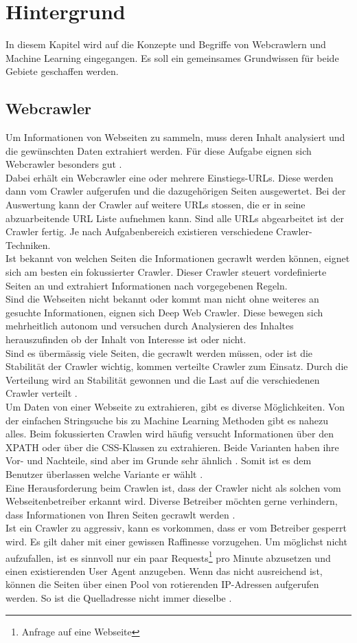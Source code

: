 \section{Hintergrund}
In diesem Kapitel wird auf die Konzepte und Begriffe von Webcrawlern und Machine Learning eingegangen. Es soll ein gemeinsames Grundwissen für beide Gebiete geschaffen werden.
%
\subsection{Webcrawler}
Um Informationen von Webseiten zu sammeln, muss deren Inhalt analysiert und die gewünschten Daten extrahiert werden. Für diese Aufgabe eignen sich Webcrawler besonders gut \cite{scrapy_1, scrapy_2}.\\
Dabei erhält ein Webcrawler eine oder mehrere Einstiegs-URLs. Diese werden dann vom Crawler aufgerufen und die dazugehörigen Seiten ausgewertet. Bei der Auswertung kann der Crawler auf weitere URLs stossen, die er in seine abzuarbeitende URL Liste aufnehmen kann. Sind alle URLs abgearbeitet ist der Crawler fertig. Je nach Aufgabenbereich existieren verschiedene Crawler-Techniken.\\
Ist bekannt von welchen Seiten die Informationen gecrawlt werden können, eignet sich am besten ein fokussierter Crawler. Dieser Crawler steuert vordefinierte Seiten an und extrahiert Informationen nach vorgegebenen Regeln.\\
Sind die Webseiten nicht bekannt oder kommt man nicht ohne weiteres an gesuchte Informationen, eignen sich Deep Web Crawler. Diese bewegen sich mehrheitlich autonom und versuchen durch Analysieren des Inhaltes herauszufinden ob der Inhalt von Interesse ist oder nicht.\\
Sind es übermässig viele Seiten, die gecrawlt werden müssen, oder ist die Stabilität der Crawler wichtig, kommen verteilte Crawler zum Einsatz. Durch die Verteilung wird an Stabilität gewonnen und die Last auf die verschiedenen Crawler verteilt \cite{scrapy_3}.\\[2ex]
%
Um Daten von einer Webseite zu extrahieren, gibt es diverse Möglichkeiten. Von der einfachen Stringsuche bis zu Machine Learning Methoden gibt es nahezu alles. Beim fokussierten Crawlen wird häufig versucht Informationen über den XPATH oder über die CSS-Klassen zu extrahieren. Beide Varianten haben ihre Vor- und Nachteile, sind aber im Grunde sehr ähnlich \cite{xpath_vs_css}. Somit ist es dem Benutzer überlassen welche Variante er wählt \cite{xpath}.\\[2ex]
%
Eine Herausforderung beim Crawlen ist, dass der Crawler nicht als solchen vom Webseitenbetreiber erkannt wird. Diverse Betreiber möchten gerne verhindern, dass Informationen von Ihren Seiten gecrawlt werden \cite{comparis}.\\
Ist ein Crawler zu aggressiv, kann es vorkommen, dass er vom Betreiber gesperrt wird. Es gilt daher mit einer gewissen Raffinesse vorzugehen. Um möglichst nicht aufzufallen, ist es sinnvoll nur ein paar Requests\footnote{Anfrage auf eine Webseite} pro Minute abzusetzen und einen existierenden User Agent anzugeben. Wenn das nicht ausreichend ist, können die Seiten über einen Pool von rotierenden IP-Adressen aufgerufen werden. So ist die Quelladresse nicht immer dieselbe \cite{offensive_crawling}.
%
